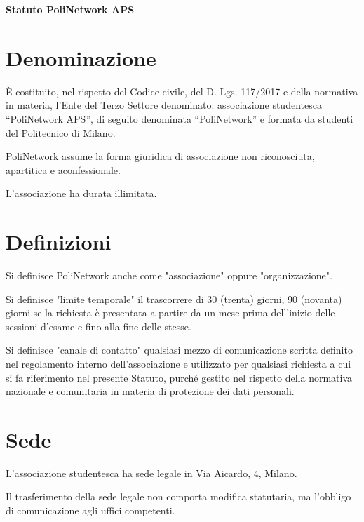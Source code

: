 \documentclass[legalpaper, 11pt]{exam}
\let\tempone\enumerate
\let\temptwo\endenumerate
\renewenvironment{enumerate}{\tempone\addtolength{\itemsep}{-0.45\baselineskip}}{\temptwo}
\begin{document}
\linenumbers

{

\begin{center}


\begin{center}
{\textbf{Statuto PoliNetwork APS}}

\end{center}



\end{center}


\section{Denominazione}
\begin{enumerate}
 \item È costituito, nel rispetto del Codice civile, del D. Lgs. 117/2017 e della normativa in materia, l’Ente del Terzo Settore denominato: associazione studentesca “PoliNetwork APS”, di seguito denominata “PoliNetwork” e formata da studenti del Politecnico di Milano.
 \item PoliNetwork assume la forma giuridica di associazione non riconosciuta, apartitica e aconfessionale.
 \item L'associazione ha durata illimitata.
\end{enumerate}

\section{Definizioni}
\begin{enumerate}
 \item Si definisce PoliNetwork anche come "associazione" oppure "organizzazione".
 \item Si definisce "limite temporale" il trascorrere di 30 (trenta) giorni, 90 (novanta) giorni se la richiesta è presentata a partire da un mese prima dell'inizio delle sessioni d'esame e fino alla fine delle stesse.
 \item Si definisce "canale di contatto" qualsiasi mezzo di comunicazione scritta definito nel regolamento interno dell'associazione e utilizzato per qualsiasi richiesta a cui si fa riferimento nel presente Statuto, purché gestito nel rispetto della normativa nazionale e comunitaria in materia di protezione dei dati personali.
\end{enumerate}

\section{Sede}
\begin{enumerate}
 \item L’associazione studentesca ha sede legale in Via Aicardo, 4, Milano.
 \item Il trasferimento della sede legale non comporta modifica statutaria, ma l’obbligo di comunicazione agli uffici competenti.
\end{enumerate}

}
\end{document}
